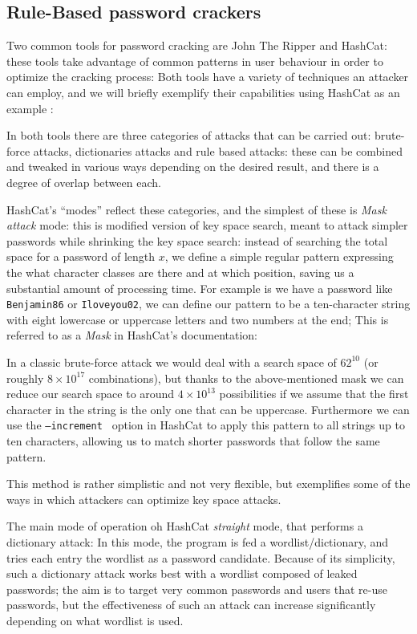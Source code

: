 \subsection{Rule-Based password crackers} \label{hash_and_jtr}

Two common tools for password cracking are John The Ripper and \break \mbox{HashCat}\cite{john,hash_cat}: these tools take advantage of common patterns in user behaviour in order to optimize the cracking process: Both tools have a variety of techniques an attacker can employ, and we will briefly exemplify their capabilities using HashCat as an example \cite{hash_cat_wiki}:

In both tools there are three categories of attacks that can be carried out: brute-force attacks, dictionaries attacks and rule based attacks: these can be combined and tweaked in various ways depending on the desired result, and there is a degree of overlap between each.

HashCat's \enquote{modes} reflect these categories, and the simplest of these is \emph{Mask attack} mode: this is modified version of key space search, meant to attack simpler passwords while shrinking the key space search: 
instead of searching the total space for a password of length $x$, we define a simple regular pattern expressing the what character classes are there and at which position, saving us a substantial amount of processing time.
For example is we have a password like \texttt{Benjamin86} or \texttt{Iloveyou02}, we can define our pattern to be a ten-character string with eight lowercase or uppercase letters and two numbers at the end; This is referred to as a \emph{Mask} in HashCat's documentation:

In a classic brute-force attack we would deal with a search space of $62^{10}$ (or roughly $8 \times 10^{17}$ combinations), but thanks to the above-mentioned mask we can reduce our search space to around $4 \times 10^{13}$ possibilities if we assume that the first character in the string is the only one that can be uppercase.
Furthermore we can use the \texttt{--increment } option in HashCat to apply this pattern to all strings up to ten characters, allowing us to match shorter passwords that follow the same pattern.

This method is rather simplistic and not very flexible, but exemplifies some of the ways in which attackers can optimize key space attacks.

The main mode of operation oh HashCat \emph{straight} mode, that performs a dictionary attack: In this mode, the program is fed a wordlist/dictionary, and tries each entry the wordlist as a password candidate. Because of its simplicity, such a dictionary attack works best with a wordlist composed of leaked passwords; the aim is to target very common passwords and users that re-use passwords, but the effectiveness of such an attack can increase significantly depending on what wordlist is used.

